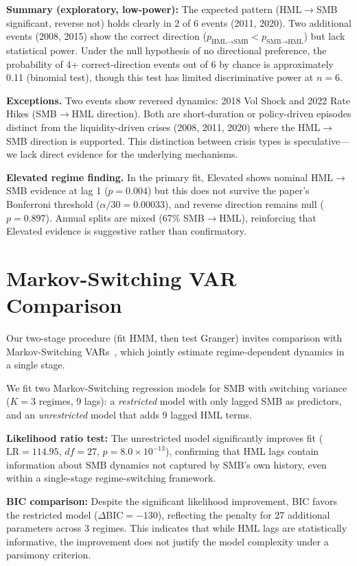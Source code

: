 \documentclass[sigconf,anonymous]{acmart}
\begin{document}
\textbf{Summary (exploratory, low-power):} The expected pattern (HML$\to$SMB
significant, reverse not) holds clearly in 2 of 6 events (2011, 2020). Two additional
events (2008, 2015)
show the correct direction ($p_{\text{HML}\to\text{SMB}} < p_{\text{SMB}\to\text{HML}}$)
but lack statistical power. Under the null hypothesis of no directional preference,
the probability of 4+ correct-direction events out of 6 by chance is approximately
0.11 (binomial test), though this test has limited discriminative power at $n = 6$.

\textbf{Exceptions.} Two events show reversed dynamics: 2018 Vol Shock and
2022 Rate Hikes (SMB$\to$HML direction). Both are short-duration or
policy-driven episodes distinct from the liquidity-driven crises (2008, 2011, 2020)
where the HML$\to$SMB direction is supported. This distinction between crisis
types is speculative---we lack direct evidence for the underlying mechanisms.

\textbf{Elevated regime finding.} In the primary fit, Elevated shows nominal
HML$\to$SMB evidence at lag 1 ($p = 0.004$) but this does not survive the
paper's Bonferroni threshold ($\alpha/30 = 0.00033$), and reverse direction
remains null ($p = 0.897$). Annual splits are mixed (67\% SMB$\to$HML),
reinforcing that Elevated evidence is suggestive rather than confirmatory.

\section{Markov-Switching VAR Comparison}
\label{app:msvar}

Our two-stage procedure (fit HMM, then test Granger) invites comparison with
Markov-Switching VARs~\cite{krolzig1997markov}, which jointly estimate
regime-dependent dynamics in a single stage.

We fit two Markov-Switching regression models for SMB with switching variance
($K = 3$ regimes, 9 lags): a \emph{restricted} model with only lagged SMB as
predictors, and an \emph{unrestricted} model that adds 9 lagged HML terms.

\textbf{Likelihood ratio test:} The unrestricted model significantly improves fit
($\text{LR} = 114.95$, $df = 27$, $p = 8.0 \times 10^{-13}$), confirming that
HML lags contain information about SMB dynamics not captured by SMB's own history,
even within a single-stage regime-switching framework.

\textbf{BIC comparison:} Despite the significant likelihood improvement, BIC favors
the restricted model ($\Delta\text{BIC} = -130$), reflecting the penalty for 27
additional parameters across 3 regimes. This indicates that while HML lags are
statistically informative, the improvement does not justify the model complexity
under a parsimony criterion.
\end{document}
